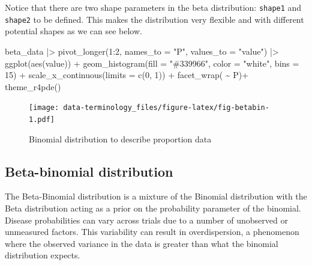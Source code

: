 \documentclass[
  letterpaper,
]{book}
\newenvironment{Shaded}{\begin{snugshade}}{\end{snugshade}}
\newcommand{\AttributeTok}[1]{\textcolor[rgb]{0.40,0.45,0.13}{#1}}
\newcommand{\DecValTok}[1]{\textcolor[rgb]{0.68,0.00,0.00}{#1}}
\newcommand{\FunctionTok}[1]{\textcolor[rgb]{0.28,0.35,0.67}{#1}}
\newcommand{\NormalTok}[1]{\textcolor[rgb]{0.00,0.23,0.31}{#1}}
\newcommand{\SpecialCharTok}[1]{\textcolor[rgb]{0.37,0.37,0.37}{#1}}
\newcommand{\StringTok}[1]{\textcolor[rgb]{0.13,0.47,0.30}{#1}}
\begin{document}
Notice that there are two shape parameters in the beta distribution:
\texttt{shape1} and \texttt{shape2} to be defined. This makes the
distribution very flexible and with different potential shapes as we can
see below.

\begin{Shaded}
\begin{Highlighting}[]
\NormalTok{beta\_data }\SpecialCharTok{|\textgreater{}}
  \FunctionTok{pivot\_longer}\NormalTok{(}\DecValTok{1}\SpecialCharTok{:}\DecValTok{2}\NormalTok{, }\AttributeTok{names\_to =} \StringTok{"P"}\NormalTok{,}
               \AttributeTok{values\_to =} \StringTok{"value"}\NormalTok{) }\SpecialCharTok{|\textgreater{}}
  \FunctionTok{ggplot}\NormalTok{(}\FunctionTok{aes}\NormalTok{(value)) }\SpecialCharTok{+}
  \FunctionTok{geom\_histogram}\NormalTok{(}\AttributeTok{fill =} \StringTok{"\#339966"}\NormalTok{,}
                 \AttributeTok{color =} \StringTok{"white"}\NormalTok{,}
                 \AttributeTok{bins =} \DecValTok{15}\NormalTok{) }\SpecialCharTok{+}
  \FunctionTok{scale\_x\_continuous}\NormalTok{(}\AttributeTok{limits =} \FunctionTok{c}\NormalTok{(}\DecValTok{0}\NormalTok{, }\DecValTok{1}\NormalTok{)) }\SpecialCharTok{+}
  \FunctionTok{facet\_wrap}\NormalTok{( }\SpecialCharTok{\textasciitilde{}}\NormalTok{ P)}\SpecialCharTok{+}
  \FunctionTok{theme\_r4pde}\NormalTok{()}
\end{Highlighting}
\end{Shaded}

\begin{figure}

\texttt{[image: data-terminology\_files/figure-latex/fig-betabin-1.pdf]} \hfill{}

\caption{\label{fig-betabin}Binomial distribution to describe proportion
data}

\end{figure}

\hypertarget{beta-binomial-distribution}{%
\subsection{Beta-binomial
distribution}\label{beta-binomial-distribution}}

The Beta-Binomial distribution is a mixture of the Binomial distribution
with the Beta distribution acting as a prior on the probability
parameter of the binomial. Disease probabilities can vary across trials
due to a number of unobserved or unmeasured factors. This variability
can result in overdispersion, a phenomenon where the observed variance
in the data is greater than what the binomial distribution expects.
\end{document}
